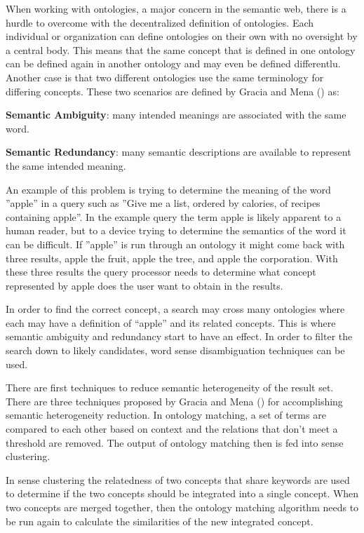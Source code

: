 \documentclass[10pt,journal,compsoc]{IEEEtran}
\begin{document}
When working with ontologies, a major concern in the semantic web, there is a hurdle to overcome with the decentralized definition of ontologies. Each individual or organization can define ontologies on their own with no oversight by a central body. This means that the same concept that is defined in one ontology can be defined again in another ontology and may even be defined differentlu. Another case is that two different ontologies use the same terminology for differing concepts. These two scenarios are defined by Gracia and Mena (\cite{gracia_dealing_2011}) as:
\begin{center} \textbf{Semantic Ambiguity}: many intended meanings are associated with the same word.\end{center}
\begin{center} \textbf{Semantic Redundancy}: many semantic descriptions are available to represent the same intended meaning.\end{center}

An example of this problem is trying to determine the meaning of the word ''apple'' in a query such as ''Give me a list, ordered by calories, of recipes containing apple''. In the example query the term apple is likely apparent to a human reader, but to a device trying to determine the semantics of the word it can be difficult. If ''apple'' is run through an ontology it might come back with three results, apple the fruit, apple the tree, and apple the corporation. With these three results the query processor needs to determine what concept represented by apple does the user want to obtain in the results.

In order to find the correct concept, a search may cross many ontologies where each may have a definition of “apple” and its related concepts. This is where semantic ambiguity and redundancy start to have an effect. In order to filter the search down to likely candidates, word sense disambiguation techniques can be used.

There are first techniques to reduce semantic heterogeneity of the result set. There are three techniques proposed by Gracia and Mena (\cite{gracia_dealing_2011}) for accomplishing semantic heterogeneity reduction. In ontology matching, a set of terms are compared to each other based on context and the relations that don't meet a threshold are removed. The output of ontology matching then is fed into sense clustering. 

In sense clustering the relatedness of two concepts that share keywords are used to determine if the two concepts should be integrated into a single concept. When two concepts are merged together, then the ontology matching algorithm needs to be run again to calculate the similarities of the new integrated concept.
\end{document}
